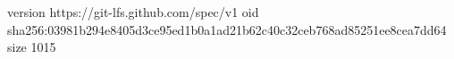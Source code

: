 version https://git-lfs.github.com/spec/v1
oid sha256:03981b294e8405d3ce95ed1b0a1ad21b62c40c32ceb768ad85251ee8cea7dd64
size 1015
